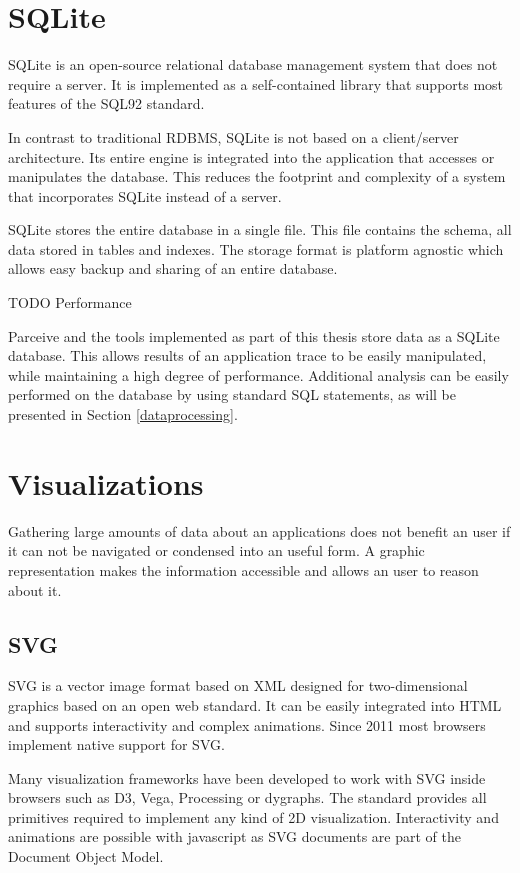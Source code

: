 \section{SQLite}

SQLite \cite{sqlitebook} is an open-source relational database management system that does not require a server. It is implemented as a self-contained library that supports most features of the SQL92 standard.

In contrast to traditional RDBMS, SQLite is not based on a client/server architecture. Its entire engine is integrated into the application that accesses or manipulates the database. This reduces the footprint and complexity of a system that incorporates SQLite instead of a server.

SQLite stores the entire database in a single file. This file contains the schema, all data stored in tables and indexes. The storage format is platform agnostic which allows easy backup and sharing of an entire database.

TODO Performance

Parceive and the tools implemented as part of this thesis store data as a SQLite database. This allows results of an application trace to be easily manipulated, while maintaining a high degree of performance. Additional analysis can be easily performed on the database by using standard SQL statements, as will be presented in Section \ref{dataprocessing}.

\section {Visualizations}

Gathering large amounts of data about an applications does not benefit an user if it can not be navigated or condensed into an useful form. A graphic representation makes the information accessible and allows an user to reason about it.

\subsection {SVG}

SVG \cite{svg11} is a vector image format based on XML designed for two-dimensional graphics based on an open web standard. It can be easily integrated into HTML and supports interactivity and complex animations. Since 2011 most browsers implement native support for SVG.

Many visualization frameworks have been developed to work with SVG inside browsers such as D3, Vega, Processing or dygraphs. The standard provides all primitives required to implement any kind of 2D visualization. Interactivity and animations are possible with javascript as SVG documents are part of the Document Object Model.

